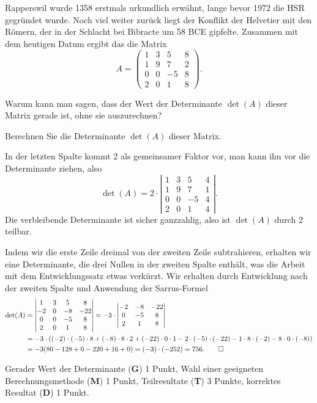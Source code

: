 Rapperswil wurde 1358 erstmals urkundlich erwähnt, lange bevor 1972 die
HSR gegründet wurde.
Noch viel weiter zurück liegt der Konflikt der Helvetier mit den
Römern, der in der Schlacht bei Bibracte um 58 BCE gipfelte.
Zusammen mit dem heutigen Datum ergibt das die Matrix
\[
A
=
\begin{pmatrix}
1&3& 5&8\\
1&9& 7&2\\
0&0&-5&8\\
2&0& 1&8
\end{pmatrix}.
\]
\begin{teilaufgaben}
\item
Warum kann man sagen, dass der Wert der Determinante $\det(A)$ dieser Matrix
gerade ist, ohne sie auszurechnen?
\item
Berechnen Sie die Determinante $\det(A)$ dieser Matrix.
\end{teilaufgaben}


\begin{loesung}
\begin{teilaufgaben}
\item
In der letzten Spalte kommt 2 als gemeinsamer Faktor vor, man kann
ihn vor die Determinante ziehen, also
\[
\det(A)
=
2\cdot
\left|\begin{matrix}
 1&3& 5&  4\\
 1&9& 7&  1\\
 0&0&-5&  4\\
 2&0& 1&  4
\end{matrix}\right|.
\]
Die verbleibende Determinante ist sicher ganzzahlig, also ist $\det(A)$
durch 2 teilbar.
\item
Indem wir die erste Zeile dreimal von der zweiten Zeile subtrahieren,
erhalten wir eine Determinante, die drei Nullen in der zweiten Spalte
enthält, was die Arbeit mit dem Entwicklungssatz etwas verkürzt.
Wir erhalten durch Entwicklung nach der zweiten Spalte und Anwendung
der Sarrus-Formel
\begin{align*}
\det(A)
&=
\left|\begin{matrix}
 1&3& 5&  8\\
-2&0&-8&-22\\
 0&0&-5&  8\\
 2&0& 1&  8
\end{matrix}\right|
=
-3\cdot\left|\begin{matrix}
-2&-8&-22\\
 0&-5&  8\\
 2& 1&  8
\end{matrix}\right|
\\
&=
-3\cdot(
(-2)\cdot(-5)\cdot 8
+
(-8)\cdot 8\cdot 2
+
(-22)\cdot0\cdot 1
-
2\cdot(-5)\cdot(-22)
-
1\cdot 8\cdot (-2)
-
8\cdot 0\cdot (-8)
)
\\
&=
-3(80-128+0-220+16+0)
=
(-3)\cdot(-252)=756.
\qedhere
\end{align*}
\end{teilaufgaben}
\end{loesung}

\begin{bewertung}
Gerader Wert der Determinante ({\bf G}) 1 Punkt,
Wahl einer geeigneten Berechnungsmethode ({\bf M}) 1 Punkt,
Teilresultate ({\bf T}) 3 Punkte,
korrektes Resultat ({\bf D}) 1 Punkt.
\end{bewertung}

